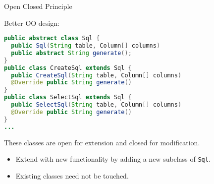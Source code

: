 \documentclass{beamer}
\begin{document}
\begin{frame}[fragile]{Open Closed Principle}


Better OO design:
\begin{lstlisting}[language=Java]
public abstract class Sql {
  public Sql(String table, Column[] columns)
  public abstract String generate();
}
public class CreateSql extends Sql {
  public CreateSql(String table, Column[] columns)
  @Override public String generate()
}
public class SelectSql extends Sql {
  public SelectSql(String table, Column[] columns)
  @Override public String generate()
}
...
\end{lstlisting}
These classes are open for extension and closed for modification.
\begin{itemize}
\item Extend with new functionality by adding a new subclass of {\tt Sql}.
\item Existing classes need not be touched.
\end{itemize}


\end{frame}








\end{document}
